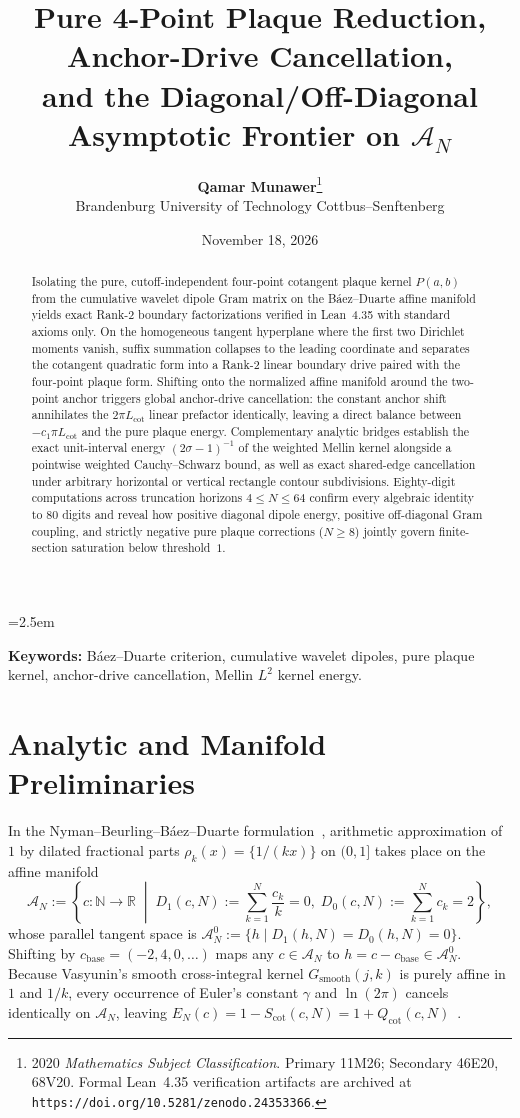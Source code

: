 \documentclass[10pt,a4paper]{article}
\title{\textbf{Pure 4-Point Plaque Reduction, Anchor-Drive Cancellation,\\
and the Diagonal/Off-Diagonal Asymptotic Frontier on \texorpdfstring{$\mathcal{A}_N$}{A\_N}}}
\author{\textbf{Qamar Munawer}\thanks{2020 \emph{Mathematics Subject Classification}. Primary 11M26; Secondary 46E20, 68V20. Formal Lean~4.35 verification artifacts are archived at \texttt{https://doi.org/10.5281/zenodo.24353366}.}\\[0.25em]
\small Brandenburg University of Technology Cottbus--Senftenberg}
\date{November 18, 2026}
\theoremstyle{definition}
\begin{document}
\linespread{1.12}\selectfont
\emergencystretch=2.5em

\maketitle

\begin{abstract}
Isolating the pure, cutoff-independent four-point cotangent plaque kernel $P(a,b)$ from the cumulative wavelet dipole Gram matrix on the B\'aez--Duarte affine manifold yields exact Rank-$2$ boundary factorizations verified in Lean~4.35 with standard axioms only. On the homogeneous tangent hyperplane where the first two Dirichlet moments vanish, suffix summation collapses to the leading coordinate and separates the cotangent quadratic form into a Rank-$2$ linear boundary drive paired with the four-point plaque form. Shifting onto the normalized affine manifold around the two-point anchor triggers global anchor-drive cancellation: the constant anchor shift annihilates the $2\pi L_{\mathrm{cot}}$ linear prefactor identically, leaving a direct balance between $-c_1 \pi L_{\mathrm{cot}}$ and the pure plaque energy. Complementary analytic bridges establish the exact unit-interval energy $(2\sigma-1)^{-1}$ of the weighted Mellin kernel alongside a pointwise weighted Cauchy--Schwarz bound, as well as exact shared-edge cancellation under arbitrary horizontal or vertical rectangle contour subdivisions. Eighty-digit computations across truncation horizons $4 \le N \le 64$ confirm every algebraic identity to $80$ digits and reveal how positive diagonal dipole energy, positive off-diagonal Gram coupling, and strictly negative pure plaque corrections ($N \ge 8$) jointly govern finite-section saturation below threshold~$1$.
\end{abstract}

\noindent\textbf{Keywords:} B\'aez--Duarte criterion, cumulative wavelet dipoles, pure plaque kernel, anchor-drive cancellation, Mellin $L^2$ kernel energy.

\section{Analytic and Manifold Preliminaries}

In the Nyman--Beurling--B\'aez--Duarte formulation~\cite{Nyman1950,Beurling1955,BaezDuarte2003,Vasyunin1995}, arithmetic approximation of $1$ by dilated fractional parts $\rho_k(x) = \{1/(kx)\}$ on $(0,1]$ takes place on the affine manifold
\[
\mathcal{A}_N := \left\{ c : \mathbb{N} \to \mathbb{R} \;\middle|\; D_1(c,N) := \sum_{k=1}^N \frac{c_k}{k} = 0, \; D_0(c,N) := \sum_{k=1}^N c_k = 2 \right\},
\]
whose parallel tangent space is $\mathcal{A}_N^0 := \{ h \mid D_1(h,N) = D_0(h,N) = 0 \}$. Shifting by $c_{\mathrm{base}} = (-2, 4, 0, \dots)$ maps any $c \in \mathcal{A}_N$ to $h = c - c_{\mathrm{base}} \in \mathcal{A}_N^0$. Because Vasyunin's smooth cross-integral kernel $G_{\mathrm{smooth}}(j,k)$ is purely affine in $1$ and $1/k$, every occurrence of Euler's constant $\gamma$ and $\ln(2\pi)$ cancels identically on $\mathcal{A}_N$, leaving $E_N(c) = 1 - S_{\mathrm{cot}}(c, N) = 1 + Q_{\mathrm{cot}}(c, N)$~\cite{Vasyunin1995,Titchmarsh1986}.
\end{document}
